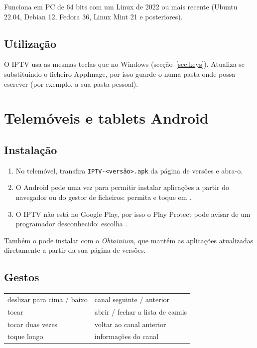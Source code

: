 Funciona em PC de 64 bits com um Linux de 2022 ou mais recente (Ubuntu
22.04, Debian 12, Fedora 36, Linux Mint 21 e posteriores).


\subsection{Utilização}
O IPTV usa as mesmas teclas que no Windows (secção~\ref{sec:keys}).
Atualiza-se substituindo o ficheiro AppImage, por isso guarde-o numa pasta
onde possa escrever (por exemplo, a sua pasta pessoal).

\section{Telemóveis e tablets Android}

\subsection{Instalação}
\begin{enumerate}
  \item No telemóvel, transfira \texttt{IPTV-\textless versão\textgreater.apk}
        da página de versões e abra-o.
  \item O Android pede uma vez para permitir instalar aplicações a partir do
        navegador ou do gestor de ficheiros: permita e toque em
        .
  \item O IPTV não está no Google Play, por isso o Play Protect pode avisar
        de um programador desconhecido: escolha .
\end{enumerate}
Também o pode instalar com o \emph{Obtainium}, que mantém as aplicações
atualizadas diretamente a partir da sua página de versões.

\subsection{Gestos}
\begin{xltabular}{\linewidth}{@{}KX@{}}
deslizar para cima / baixo & canal seguinte / anterior \\
tocar & abrir / fechar a lista de canais \\
tocar duas vezes & voltar ao canal anterior \\
toque longo & informações do canal \\
\bottomrule
\end{xltabular}

